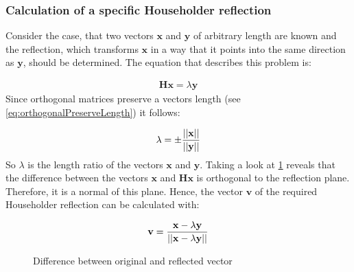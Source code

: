 
\subsubsection{Calculation of a specific Householder reflection}
\label{sec:householderCalculateSpecificReflection}

Consider the case, that two vectors $\mathbf{x}$ and $\mathbf{y}$ of arbitrary length are known and the reflection, which transforms $\mathbf{x}$ in a way that it points into the same direction as $\mathbf{y}$, should be determined.
The equation that describes this problem is:

\begin{align}
\label{eq:housholderCalculateReflection}
\mathbf{H} \mathbf{x} = \lambda \mathbf{y}
\end{align}
%
Since orthogonal matrices preserve a vectors length (see \cref{eq:orthogonalPreserveLength}) it follows:

\begin{align}
\label{eq:housholderCalculateReflectionLambda}
\lambda = \pm \frac{\left\vert\left\vert\mathbf{x}\right\vert\right\vert}{\left\vert\left\vert\mathbf{y}\right\vert\right\vert}
\end{align}
%
So $\lambda$ is the length ratio of the vectors $\mathbf{x}$ and $\mathbf{y}$.
Taking a look at \cref{fig:housholderCalculateReflection} reveals that the difference between the vectors $\mathbf{x}$ and $\mathbf{Hx}$ is orthogonal to the reflection plane.
Therefore, it is a normal of this plane.
Hence, the vector $\mathbf{v}$ of the required Householder reflection can be calculated with:

\begin{align}
\label{eq:housholderCalculateReflectionNormal}
\mathbf{v} = \frac{\mathbf{x} - \lambda \mathbf{y}}{\left\vert\left\vert\mathbf{x} - \lambda \mathbf{y}\right\vert\right\vert}
\end{align}


\begin{figure}
\centering
{}
\caption{Difference between original and reflected vector}
\label{fig:housholderCalculateReflection}
\end{figure}




